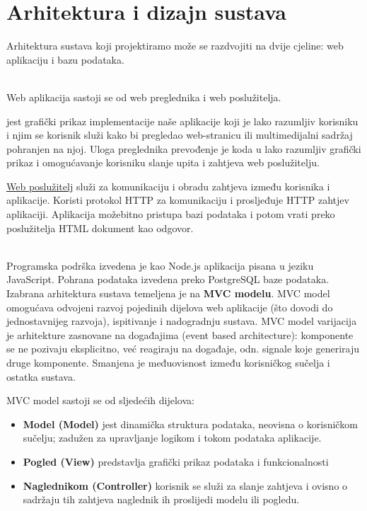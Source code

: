 \chapter{Arhitektura i dizajn sustava}
		
		\noindent\text Arhitektura sustava koji projektiramo može se razdvojiti na dvije cjeline: web aplikaciju
		i bazu podataka.\par
		\textit{}\\
		\text Web aplikacija sastoji se od web preglednika i web poslužitelja.\par
		
		  jest grafički prikaz implementacije naše aplikacije koji je lako razumljiv korisniku i njim se korisnik služi kako bi pregledao web-stranicu ili multimedijalni sadržaj pohranjen na njoj. Uloga preglednika prevođenje je koda u lako razumljiv grafički prikaz i omogućavanje korisniku slanje upita i zahtjeva web poslužitelju.\par
		
		\underline{Web poslužitelj} služi za komunikaciju i obradu zahtjeva između korisnika i aplikacije. Koristi protokol HTTP za komunikaciju i prosljeđuje HTTP zahtjev aplikaciji. Aplikacija možebitno pristupa bazi podataka i potom vrati preko poslužitelja HTML dokument kao odgovor.\par
		\textit{}\\
		\text Programska podrška izvedena je kao Node.js aplikacija pisana u jeziku JavaScript. Pohrana podataka izvedena preko PostgreSQL baze podataka. \\
		
		\noindent\text Izabrana arhitektura sustava temeljena je na \textbf{MVC modelu}. MVC model omogućava odvojeni razvoj pojedinih dijelova web aplikacije (što dovodi do jednostavnijeg razvoja), ispitivanje i nadogradnju sustava. MVC model varijacija je arhitekture zasnovane na događajima (event based architecture): komponente se ne pozivaju eksplicitno, već reagiraju na događaje, odn. signale koje generiraju druge komponente. Smanjena je međuovisnost između korisničkog sučelja i ostatka sustava.
		
MVC model sastoji se od sljedećih dijelova:\par
	\begin{itemize}
		\item 	\textbf{Model (Model)} jest dinamička struktura podataka, neovisna o korisničkom sučelju; zadužen za upravljanje logikom i tokom podataka aplikacije.
		\item 	\textbf{Pogled (View)} predstavlja grafički prikaz podataka i funkcionalnosti
		\item 	\textbf{Naglednikom (Controller)} korisnik se služi za slanje zahtjeva i ovisno o sadržaju tih zahtjeva naglednik ih proslijedi modelu ili pogledu.		
	\end{itemize}

